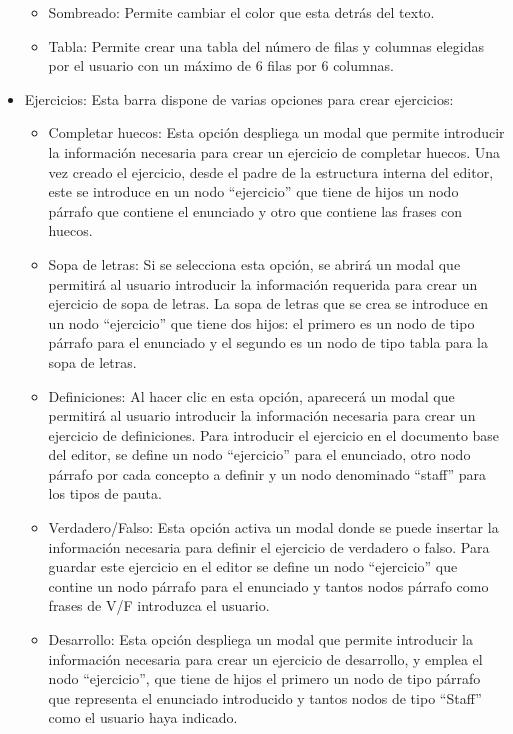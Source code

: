\begin{itemize}
\begin{itemize}
          \item Sombreado: Permite cambiar el color que esta detrás del texto.
          \item Tabla: Permite crear una tabla del número de filas y columnas elegidas por el usuario con un máximo de 6 filas por 6 columnas.
        \end{itemize}
  \item Ejercicios: Esta barra dispone de varias opciones para crear ejercicios:
        \begin{itemize}
          \item Completar huecos: Esta opción despliega un modal que permite introducir la información necesaria para crear un ejercicio de completar huecos. Una vez creado el ejercicio, desde el padre de la estructura interna del editor, este se introduce en un nodo ``ejercicio'' que tiene de hijos un nodo párrafo que contiene el enunciado y otro que contiene las frases con huecos.
          \item Sopa de letras: Si se selecciona esta opción, se abrirá un modal que permitirá al usuario introducir la información requerida para crear un ejercicio de sopa de letras. La sopa de letras que se crea se introduce en un nodo ``ejercicio'' que tiene dos hijos: el primero es un nodo de tipo párrafo para el enunciado y el segundo es un nodo de tipo tabla para la sopa de letras.
          \item Definiciones: Al hacer clic en esta opción, aparecerá un modal que permitirá al usuario introducir la información necesaria para crear un ejercicio de definiciones. Para introducir el ejercicio en el documento base del editor, se define un nodo ``ejercicio'' para el enunciado, otro nodo párrafo por cada concepto a definir y un nodo denominado ``staff'' para los tipos de pauta.
          \item Verdadero/Falso: Esta opción activa un modal donde se puede insertar la información necesaria para definir el ejercicio de verdadero o falso. Para guardar este ejercicio en el editor se define un nodo ``ejercicio'' que contine un nodo párrafo para el enunciado y tantos nodos párrafo como frases de V/F introduzca el usuario.
          \item Desarrollo: Esta opción despliega un modal que permite introducir la información necesaria para crear un ejercicio de desarrollo, y emplea el nodo ``ejercicio'', que tiene de hijos el primero un nodo de tipo párrafo que representa el enunciado introducido y tantos nodos de tipo ``Staff'' como el usuario haya indicado.

\end{itemize}
\end{itemize}
